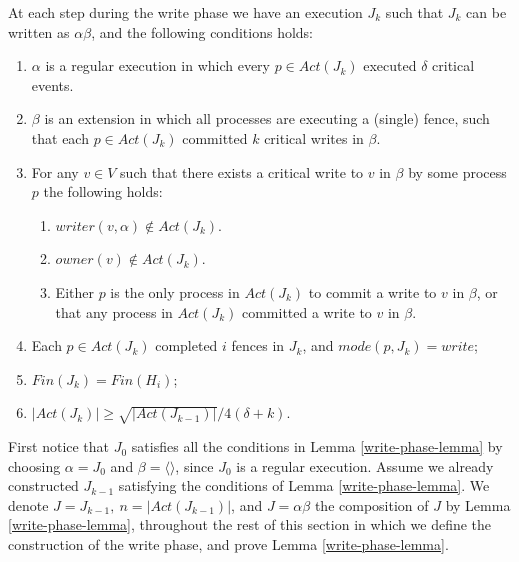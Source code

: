 \begin{lemma} \label{write-phase-lemma}
	At each step during the write phase we have an execution $J_k$ such that $J_k$ can be written as $\alpha \beta$, and the following conditions holds:
	\begin{enumerate}[(1)]
		\item $\alpha$ is a regular execution in which every $p \in Act(J_k)$ executed $\delta$ critical events.
		\item $\beta$ is an extension in which all processes are executing a (single) fence, such that each $p \in Act(J_k)$ committed $k$ critical writes in $\beta$.
		\item For any $v \in V$ such that there exists a critical write to $v$ in $\beta$ by some process $p$ the following holds:
		\begin{enumerate}
			\item $writer(v,\alpha) \notin Act(J_k)$.
			\item $owner(v) \notin Act(J_k)$.
			\item Either $p$ is the only process in $Act(J_k)$ to commit a write to $v$ in $\beta$, or that any process in $Act(J_k)$ committed a write to $v$ in $\beta$.
		\end{enumerate}
		\item Each $p\in Act(J_k)$ completed $i$ fences in $J_k$, and $mode(p, J_k) = write$;
		\item $Fin(J_k) = Fin(H_i)$;
		\item $|Act(J_k)| \geq \sqrt{|Act(J_{k-1})|}/4(\delta+k)$.
	\end{enumerate}
\end{lemma}

First notice that $J_0$ satisfies all the conditions in Lemma \ref{write-phase-lemma} by choosing $\alpha = J_0$ and $\beta = \langle \rangle$, since $J_0$ is a regular execution. Assume we already constructed $J_{k-1}$ satisfying the conditions of Lemma \ref{write-phase-lemma}. We denote $J=J_{k-1},\ n=|Act(J_{k-1})|$, and $J = \alpha \beta$ the composition of $J$ by Lemma \ref{write-phase-lemma}, throughout the rest of this section in which we define the construction of the write phase, and prove Lemma \ref{write-phase-lemma}.

